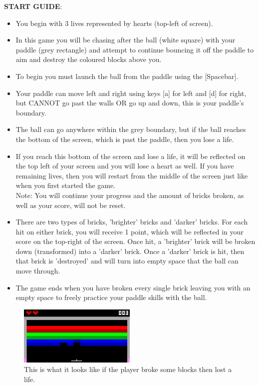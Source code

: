 \documentclass{article}
\begin{document}
\textbf{START GUIDE}:
\begin{itemize}
    \item You begin with 3 lives represented by hearts (top-left of screen). 
    \item In this game you will be chasing after the ball (white square) with your paddle (grey rectangle) and attempt to continue bouncing it off the paddle to aim and destroy the coloured blocks above you.
    \item To begin you must launch the ball from the paddle using the [Spacebar].
    \item Your paddle can move left and right using keys [a] for left and [d] for right, but CANNOT go past the walls OR go up and down, this is your paddle's boundary.
    \item The ball can go anywhere within the grey boundary, but if the ball reaches the bottom of the screen, which is past the paddle, then you lose a life.
    \item If you reach this bottom of the screen and lose a life, it will be reflected on the top left of your screen and you will lose a heart as well. If you have remaining lives, then you will restart from the middle of the screen just like when you first started the game. \\ Note: You will continue your progress and the amount of bricks broken, as well as your score, will not be reset.
    \item There are two types of bricks, 'brighter' bricks and 'darker' bricks. For each hit on either brick, you will receive 1 point, which will be reflected in your score on the top-right of the screen. Once hit, a 'brighter' brick will be broken down (transformed) into a 'darker' brick. Once a 'darker' brick is hit, then that brick is 'destroyed' and will turn into empty space that the ball can move through. 
    \item The game ends when you have broken every single brick leaving you with an empty space to freely practice your paddle skills with the ball.
\end{itemize}

\begin{figure}[ht!]
    \centering
    \includegraphics[width=0.5\textwidth]{gameplay1.png}
    \caption{This is what it looks like if the player broke some blocks then lost a life.}
    \label{f: Gameplay 1}
\end{figure}
\end{document}

